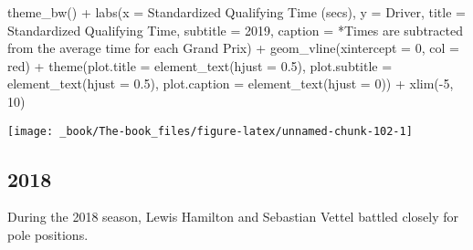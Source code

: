\documentclass[
]{book}
\newenvironment{Shaded}{\begin{snugshade}}{\end{snugshade}}
\newcommand{\AttributeTok}[1]{\textcolor[rgb]{0.77,0.63,0.00}{#1}}
\newcommand{\DecValTok}[1]{\textcolor[rgb]{0.00,0.00,0.81}{#1}}
\newcommand{\FloatTok}[1]{\textcolor[rgb]{0.00,0.00,0.81}{#1}}
\newcommand{\FunctionTok}[1]{\textcolor[rgb]{0.00,0.00,0.00}{#1}}
\newcommand{\NormalTok}[1]{#1}
\newcommand{\SpecialCharTok}[1]{\textcolor[rgb]{0.00,0.00,0.00}{#1}}
\newcommand{\StringTok}[1]{\textcolor[rgb]{0.31,0.60,0.02}{#1}}
\begin{document}
\begin{Shaded}
\begin{Highlighting}[]
  \FunctionTok{theme\_bw}\NormalTok{() }\SpecialCharTok{+}
  \FunctionTok{labs}\NormalTok{(}\AttributeTok{x =} \StringTok{\textquotesingle{}Standardized Qualifying Time (secs)\textquotesingle{}}\NormalTok{,}
       \AttributeTok{y =} \StringTok{\textquotesingle{}Driver\textquotesingle{}}\NormalTok{,}
       \AttributeTok{title =} \StringTok{\textquotesingle{}Standardized Qualifying Time\textquotesingle{}}\NormalTok{,}
       \AttributeTok{subtitle =} \StringTok{\textquotesingle{}2019\textquotesingle{}}\NormalTok{,}
       \AttributeTok{caption =} \StringTok{\textquotesingle{}*Times are subtracted from the average time for each Grand Prix\textquotesingle{}}\NormalTok{) }\SpecialCharTok{+}
  \FunctionTok{geom\_vline}\NormalTok{(}\AttributeTok{xintercept =} \DecValTok{0}\NormalTok{, }\AttributeTok{col =} \StringTok{\textquotesingle{}red\textquotesingle{}}\NormalTok{) }\SpecialCharTok{+}
  \FunctionTok{theme}\NormalTok{(}\AttributeTok{plot.title =} \FunctionTok{element\_text}\NormalTok{(}\AttributeTok{hjust =} \FloatTok{0.5}\NormalTok{),}
        \AttributeTok{plot.subtitle =} \FunctionTok{element\_text}\NormalTok{(}\AttributeTok{hjust =} \FloatTok{0.5}\NormalTok{),}
        \AttributeTok{plot.caption =} \FunctionTok{element\_text}\NormalTok{(}\AttributeTok{hjust =} \DecValTok{0}\NormalTok{)) }\SpecialCharTok{+}
  \FunctionTok{xlim}\NormalTok{(}\SpecialCharTok{{-}}\DecValTok{5}\NormalTok{, }\DecValTok{10}\NormalTok{)}
\end{Highlighting}
\end{Shaded}

\begin{center}\texttt{[image: \_book/The-book\_files/figure-latex/unnamed-chunk-102-1]} \end{center}

\hypertarget{section-5}{%
\subsection{2018}\label{section-5}}

During the 2018 season, Lewis Hamilton and Sebastian Vettel battled closely for pole positions.
\end{document}
